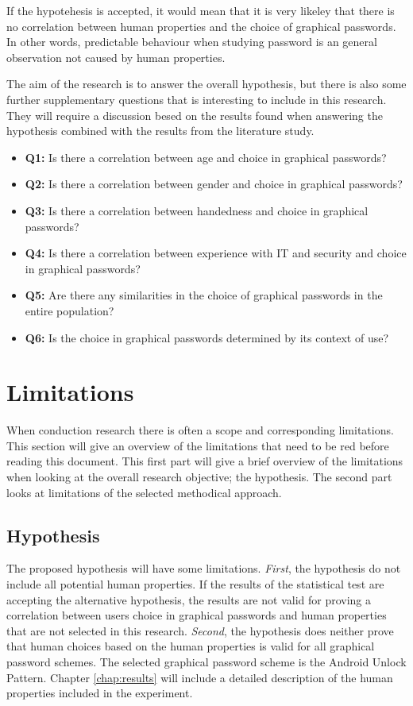 	  If the hypotehesis is accepted, it would mean that it is very likeley that there is no correlation between human properties and the choice of graphical passwords. In other words, predictable behaviour when studying password is an general observation not caused by human properties.

		The aim of the research is to answer the overall hypothesis, but there is also some further supplementary questions that is interesting to include in this research. They will require a discussion besed on the results found when answering the hypothesis combined with the results from the literature study.

	  {\renewcommand\labelitemi{}
			\begin{itemize}[leftmargin=*]
	  		\item {\bf Q1:} Is there a correlation between age and choice in graphical passwords?
	  		\item {\bf Q2:} Is there a correlation between gender and choice in graphical passwords?
	  		\item {\bf Q3:} Is there a correlation between handedness and choice in graphical passwords?
	  		\item {\bf Q4:} Is there a correlation between experience with IT and security and choice in graphical passwords?
	  		\item {\bf Q5:} Are there any similarities in the choice of graphical passwords in the entire population?
	  		\item {\bf Q6:} Is the choice in graphical passwords determined by its context of use?
	  	\end{itemize}
	  }

	\section{Limitations}
		When conduction research there is often a scope and corresponding limitations. This section will give an overview of the limitations that need to be red before reading this document. This first part will give a brief overview of the limitations when looking at the overall research objective; the hypothesis. The second part looks at limitations of the selected methodical approach. 

		\subsection{Hypothesis}
	  	The proposed hypothesis will have some limitations. {\it First}, the hypothesis do not include all potential human properties. If the results of the statistical test are accepting the alternative hypothesis, the results are not valid for proving a correlation between users choice in graphical passwords and human properties that are not selected in this research. {\it Second}, the hypothesis does neither prove that human choices based on the human properties is valid for all graphical password schemes. The selected graphical password scheme is the Android Unlock Pattern. Chapter \ref{chap:results} will include a detailed description of the human properties included in the experiment.


